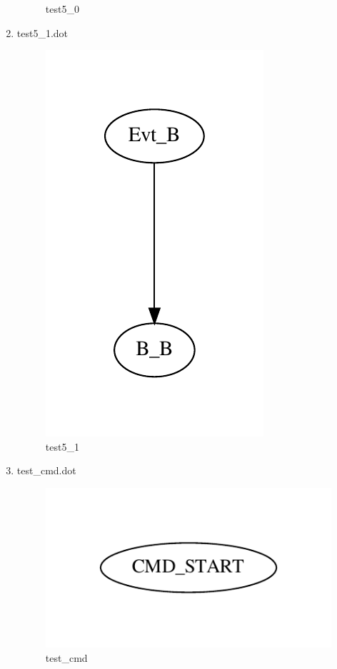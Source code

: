 \documentclass[12pt,a4paper]{report}
\begin{document}
\begin{enumerate}
\begin{figure}
        \caption{test5\_0}
        \label{fig:test5_0}
    \end{figure}
\item test5\_1.dot
    \begin{figure}
        \centering 
        \includegraphics{TestPattern/test5_1.pdf}
        \caption{test5\_1}
        \label{fig:test5_1}
    \end{figure}
\item test\_cmd.dot
    \begin{figure}
        \centering 
        \includegraphics{TestPattern/test_cmd.pdf}
        \caption{test\_cmd}
        \label{fig:test_cmd}
    \end{figure}

\end{enumerate}
\end{document}

